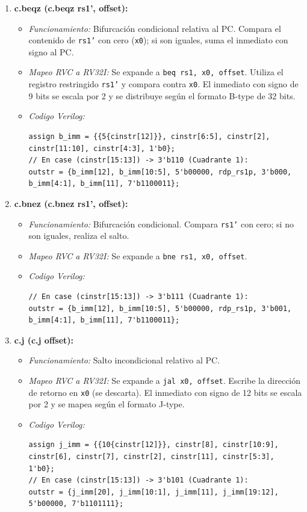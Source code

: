 \documentclass[12pt, a4paper]{article}
\begin{document}
\begin{enumerate}
    \item \textbf{c.beqz (c.beqz rs1', offset):}
    \begin{itemize}
        \item \textit{Funcionamiento:} Bifurcación condicional relativa al PC. Compara el contenido de \texttt{rs1'} con cero (\texttt{x0}); si son iguales, suma el inmediato con signo al PC.
        \item \textit{Mapeo RVC a RV32I:} Se expande a \texttt{beq rs1, x0, offset}. Utiliza el registro restringido \texttt{rs1'} y compara contra \texttt{x0}. El inmediato con signo de 9 bits se escala por 2 y se distribuye según el formato B-type de 32 bits.
        \item \textit{Codigo Verilog:}
        \begin{lstlisting}[style=verilogstyle]
assign b_imm = {{5{cinstr[12]}}, cinstr[6:5], cinstr[2], cinstr[11:10], cinstr[4:3], 1'b0};
// En case (cinstr[15:13]) -> 3'b110 (Cuadrante 1):
outstr = {b_imm[12], b_imm[10:5], 5'b00000, rdp_rs1p, 3'b000, b_imm[4:1], b_imm[11], 7'b1100011};
        \end{lstlisting}
    \end{itemize}

    \item \textbf{c.bnez (c.bnez rs1', offset):}
    \begin{itemize}
        \item \textit{Funcionamiento:} Bifurcación condicional. Compara \texttt{rs1'} con cero; si no son iguales, realiza el salto.
        \item \textit{Mapeo RVC a RV32I:} Se expande a \texttt{bne rs1, x0, offset}.
        \item \textit{Codigo Verilog:}
        \begin{lstlisting}[style=verilogstyle]
// En case (cinstr[15:13]) -> 3'b111 (Cuadrante 1):
outstr = {b_imm[12], b_imm[10:5], 5'b00000, rdp_rs1p, 3'b001, b_imm[4:1], b_imm[11], 7'b1100011};
        \end{lstlisting}
    \end{itemize}

    \item \textbf{c.j (c.j offset):}
    \begin{itemize}
        \item \textit{Funcionamiento:} Salto incondicional relativo al PC.
        \item \textit{Mapeo RVC a RV32I:} Se expande a \texttt{jal x0, offset}. Escribe la dirección de retorno en \texttt{x0} (se descarta). El inmediato con signo de 12 bits se escala por 2 y se mapea según el formato J-type.
        \item \textit{Codigo Verilog:}
        \begin{lstlisting}[style=verilogstyle]
assign j_imm = {{10{cinstr[12]}}, cinstr[8], cinstr[10:9], cinstr[6], cinstr[7], cinstr[2], cinstr[11], cinstr[5:3], 1'b0};
// En case (cinstr[15:13]) -> 3'b101 (Cuadrante 1):
outstr = {j_imm[20], j_imm[10:1], j_imm[11], j_imm[19:12], 5'b00000, 7'b1101111};
        \end{lstlisting}
    \end{itemize}


\end{enumerate}
\end{document}
